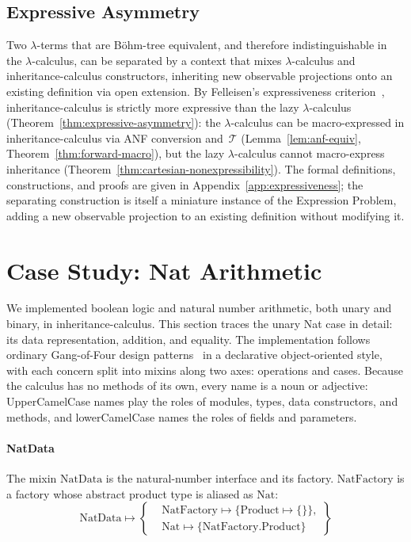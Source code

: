 \subsection{Expressive Asymmetry}
\label{sec:asymmetry}
\label{sec:formal-separation}
Two $\lambda$-terms that are B\"ohm-tree equivalent,
and therefore indistinguishable in the $\lambda$-calculus,
can be
separated by a context that mixes $\lambda$-calculus and
inheritance-calculus constructors, inheriting new observable
projections onto an existing definition via open extension.
By Felleisen's expressiveness
criterion~\cite{felleisen1991-expressive-power}, inheritance-calculus is
strictly more expressive than the lazy $\lambda$-calculus
(Theorem~\ref{thm:expressive-asymmetry}):
the $\lambda$-calculus can be macro-expressed in
inheritance-calculus via ANF conversion
and~$\mathcal{T}$
(Lemma~\ref{lem:anf-equiv}, Theorem~\ref{thm:forward-macro}),
but the lazy $\lambda$-calculus cannot macro-express inheritance
(Theorem~\ref{thm:cartesian-nonexpressibility}).
The formal definitions, constructions, and proofs are given in
Appendix~\ref{app:expressiveness};
the separating construction is itself a miniature instance of
the Expression Problem, adding a new observable projection to
an existing definition without modifying it.

\section{Case Study: Nat Arithmetic}
\label{sec:case-study}
\label{sec:expression-problem}

We implemented boolean logic and natural number arithmetic, both unary
and binary, in inheritance-calculus.
This section traces the unary Nat case in detail: its data representation,
addition, and equality.
The implementation follows ordinary Gang-of-Four design
patterns~\cite{gamma1994-design-patterns} in a declarative object-oriented
style, with each concern split into mixins along two axes: operations and
cases. Because the calculus has no methods of its own, every name is a noun or
adjective: UpperCamelCase names play the roles of modules, types, data
constructors, and methods, and lowerCamelCase names the roles of fields and
parameters.

\paragraph{NatData}
The mixin $\mathrm{NatData}$ is the natural-number interface and its factory.
$\mathrm{NatFactory}$ is a factory whose abstract product type is aliased as $\mathrm{Nat}$:
\[
  \mathrm{NatData} \mapsto \left\{
    \begin{aligned}
      &\mathrm{NatFactory} \mapsto \{\mathrm{Product} \mapsto \{\}\},\\
      &\mathrm{Nat} \mapsto \{\mathrm{NatFactory}.\mathrm{Product}\}
  \end{aligned}\right\}
\]

